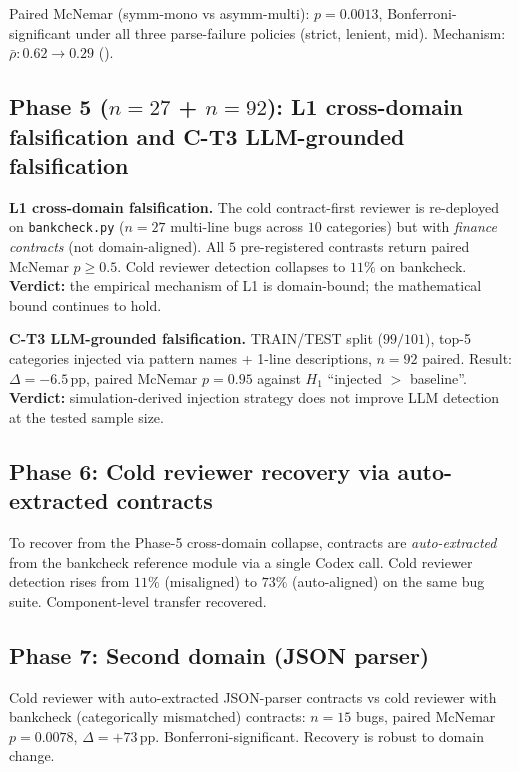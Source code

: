 Paired McNemar (symm-mono vs asymm-multi): $p = 0.0013$, Bonferroni-significant under all three parse-failure policies (strict, lenient, mid). Mechanism: $\bar{\rho}\!: 0.62 \to 0.29$ ().

\subsection{Phase 5 ($n = 27$ + $n = 92$): L1 cross-domain falsification and C-T3 LLM-grounded falsification}
\label{sec:phase5}

\textbf{L1 cross-domain falsification.} The cold contract-first reviewer is re-deployed on \texttt{bankcheck.py} ($n = 27$ multi-line bugs across $10$ categories) but with \emph{finance contracts} (not domain-aligned). All $5$ pre-registered contrasts return paired McNemar $p \ge 0.5$. Cold reviewer detection collapses to $11\%$ on bankcheck. \textbf{Verdict:} the empirical mechanism of L1 is domain-bound; the mathematical bound continues to hold.

\textbf{C-T3 LLM-grounded falsification.} TRAIN/TEST split ($99 / 101$), top-5 categories injected via pattern names + 1-line descriptions, $n = 92$ paired. Result: $\Delta = -6.5\,\mathrm{pp}$, paired McNemar $p = 0.95$ against $H_1$ ``injected $>$ baseline''. \textbf{Verdict:} simulation-derived injection strategy does not improve LLM detection at the tested sample size.

\subsection{Phase 6: Cold reviewer recovery via auto-extracted contracts}
\label{sec:phase6}

To recover from the Phase-5 cross-domain collapse, contracts are \emph{auto-extracted} from the bankcheck reference module via a single Codex call. Cold reviewer detection rises from $11\%$ (misaligned) to $73\%$ (auto-aligned) on the same bug suite. Component-level transfer recovered.

\subsection{Phase 7: Second domain (JSON parser)}
\label{sec:phase7}

Cold reviewer with auto-extracted JSON-parser contracts vs cold reviewer with bankcheck (categorically mismatched) contracts: $n = 15$ bugs, paired McNemar $p = 0.0078$, $\Delta = +73\,\mathrm{pp}$. Bonferroni-significant. Recovery is robust to domain change.

